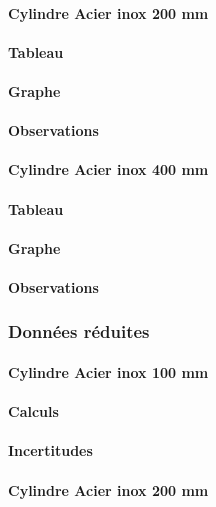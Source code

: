 \paragraph{\large Cylindre Acier inox 200 mm}
\paragraph{Tableau}
\paragraph{Graphe}
\paragraph{Observations}

\paragraph{\large Cylindre Acier inox 400 mm}
\paragraph{Tableau}
\paragraph{Graphe}
\paragraph{Observations}

\newpage

\subsubsection{\large Données réduites}
\paragraph{\large Cylindre Acier inox 100 mm}
\paragraph{Calculs}
\paragraph{Incertitudes}

\paragraph{\large Cylindre Acier inox 200 mm}
